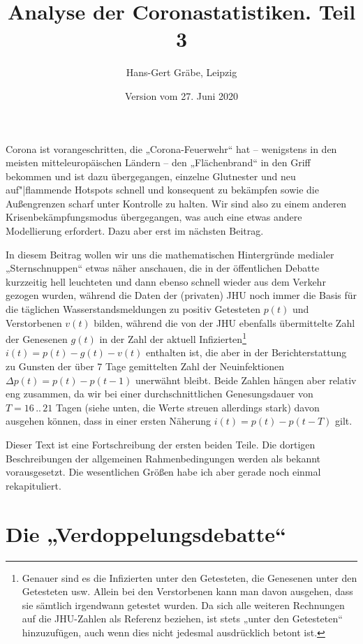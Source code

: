 \documentclass[a4paper,11pt]{article}
\title{Analyse der Coronastatistiken. Teil 3}
\author{Hans-Gert Gräbe, Leipzig}
\date{Version vom 27. Juni 2020}
\begin{document}
\maketitle

Corona ist vorangeschritten, die „Corona-Feuerwehr“ hat -- wenigstens in den
meisten mitteleuropäischen Ländern -- den „Flächenbrand“ in den Griff bekommen
und ist dazu übergegangen, einzelne Glutnester und neu auf"|flammende Hotspots
schnell und konsequent zu bekämpfen sowie die Außengrenzen scharf unter
Kontrolle zu halten.  Wir sind also zu einem anderen Krisenbekämpfungsmodus
übergegangen, was auch eine etwas andere Modellierung erfordert. Dazu aber
erst im nächsten Beitrag.

In diesem Beitrag wollen wir uns die mathematischen Hintergründe medialer
„Sternschnuppen“ etwas näher anschauen, die in der öffentlichen Debatte
kurzzeitig hell leuchteten und dann ebenso schnell wieder aus dem Verkehr
gezogen wurden, während die Daten der (privaten) JHU noch immer die Basis für
die täglichen Wasserstandsmeldungen zu positiv Getesteten $p(t)$ und
Verstorbenen $v(t)$ bilden, während die von der JHU ebenfalls übermittelte
Zahl der Genesenen $g(t)$ in der Zahl der aktuell Infizierten\footnote{Genauer
  sind es die Infizierten unter den Getesteten, die Genesenen unter den
  Getesteten usw. Allein bei den Verstorbenen kann man davon ausgehen, dass
  sie sämtlich irgendwann getestet wurden. Da sich alle weiteren Rechnungen
  auf die JHU-Zahlen als Referenz beziehen, ist stets „unter den Getesteten“
  hinzuzufügen, auch wenn dies nicht jedesmal ausdrücklich betont ist.}
$i(t)=p(t)-g(t)-v(t)$ enthalten ist, die aber in der Berichterstattung zu
Gunsten der über 7 Tage gemittelten Zahl der Neuinfektionen $\Delta
p(t)=p(t)-p(t-1)$ unerwähnt bleibt. Beide Zahlen hängen aber relativ eng
zusammen, da wir bei einer durchschnittlichen Genesungsdauer von
$T=16\,..\,21$ Tagen (siehe unten, die Werte streuen allerdings stark) davon
ausgehen können, dass in einer ersten Näherung $i(t)=p(t)-p(t-T)$ gilt.

Dieser Text ist eine Fortschreibung der ersten beiden Teile. Die dortigen
Beschreibungen der allgemeinen Rahmenbedingungen werden als bekannt
vorausgesetzt. Die wesentlichen Größen habe ich aber gerade noch einmal
rekapituliert. 

\section{Die „Verdoppelungsdebatte“}
\end{document}
